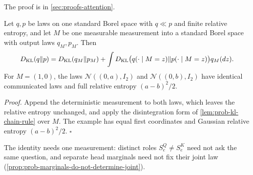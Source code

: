 The proof is in \cref{sec:proofs-attention}.

Let \(q,p\) be laws on one standard Borel space with \(q\ll p\) and finite
relative entropy, and let \(M\) be one measurable measurement into a standard
Borel space with output laws \(q_M,p_M\). Then
\begin{equation}
D_{\mathrm{KL}}(q\Vert p)=D_{\mathrm{KL}}(q_M\Vert p_M)+
\int D_{\mathrm{KL}}\bigl(q(\cdot\mid M=z)\Vert p(\cdot\mid M=z)\bigr)q_M(dz).
\label{eq:obs-selective-private-kl}
\end{equation}
For \(M=(1,0)\), the laws \(\mathcal N((0,a),I_2)\) and \(\mathcal N((0,b),I_2)\)
have identical communicated laws and full relative entropy \((a-b)^2/2\).

\noindent\emph{Proof.}
Append the deterministic measurement to both laws, which leaves the relative
entropy unchanged, and apply the disintegration form of
\cref{lem:prob-kl-chain-rule} over \(M\). The example has equal first
coordinates and Gaussian relative entropy \((a-b)^2/2\). \(\square\)

The identity needs one measurement: distinct roles \(S^Q_e\ne S^K_e\) need not
ask the same question, and separate head marginals need not fix their joint
law (\cref{prop:prob-marginals-do-not-determine-joint}).

